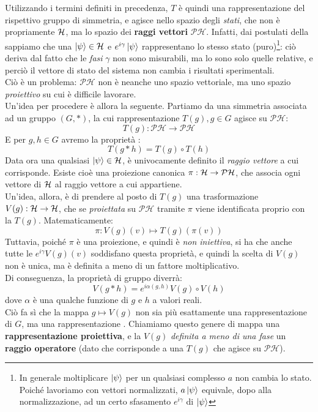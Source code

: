 \documentclass[../../FisicaTeorica.tex]{subfiles}
\begin{document}
Utilizzando i termini definiti in precedenza, $T$ è quindi una rappresentazione del rispettivo gruppo di simmetria, e agisce nello spazio degli \textit{stati}, che non è propriamente $\mathcal{H}$, ma lo spazio dei \textbf{raggi vettori} $\mathcal{PH}$. Infatti, dai postulati della \MQ sappiamo che una $\Ket{\psi} \in \mathcal{H}$ e $e^{i\gamma} \Ket{\psi}$ rappresentano lo stesso stato (puro)\footnote{In generale moltiplicare $\Ket{\psi}$ per un qualsiasi complesso $a$ non cambia lo stato. Poiché lavoriamo con vettori normalizzati, $a\Ket{\psi}$ equivale, dopo alla normalizzazione, ad un certo sfasamento $e^{i\gamma}$ di $\Ket{\psi}$}: ciò deriva dal fatto che le \textit{fasi }  $\gamma$ non sono misurabili, ma lo sono solo quelle relative, e perciò  il vettore di stato del sistema non cambia i risultati sperimentali.\\
Ciò è un problema: $\mathcal{PH}$ non è neanche uno spazio vettoriale, ma uno spazio \textit{proiettivo} su cui è difficile lavorare.\\
Un'idea per procedere è allora la seguente. Partiamo da una simmetria associata ad un gruppo $(G,*)$, la cui rappresentazione $T(g), g\in G$ agisce su $\mathcal{PH}$:
\[
T(g):\mathcal{PH}\to \mathcal{PH}
\]
E per $g, h \in G$ avremo la proprietà :
\[
T(g*h) = T(g) \circ T(h)
\]
Data ora una qualsiasi $\Ket{\psi}\in \mathcal{H}$, è univocamente definito il \textit{raggio vettore} a cui corrisponde. Esiste cioè una proiezione canonica $\pi:\mathcal{H} \to \mathcal{PH}$, che associa ogni vettore di $\mathcal{H}$ al raggio vettore a cui appartiene.\\
Un'idea, allora, è di prendere al posto di $T(g)$ una trasformazione $V(g):\mathcal{H}\to \mathcal{H}$, che se \textit{proiettata} su $\mathcal{PH}$ tramite $\pi$ viene identificata proprio con la $T(g)$. Matematicamente:
\[
\pi: 
V(g)(v)\mapsto T(g)(\pi(v))
\]
Tuttavia, poiché $\pi$ è una proiezione, e quindi è \textit{non iniettiva}, si ha che anche tutte le $e^{i\gamma}V(g)(v)$ soddisfano questa proprietà, e quindi la scelta di $V(g)$ non è unica, ma è definita a meno di un fattore moltiplicativo.\\
Di conseguenza, la proprietà di gruppo diverrà:
\[
V(g*h) = e^{i\alpha(g,h)} V(g) \circ V(h)
\]
dove $\alpha$ è una qualche funzione di $g$ e $h$ a valori reali.\\
Ciò fa sì che la mappa $g \mapsto V(g)$ non sia più esattamente una rappresentazione di $G$, ma una rappresentazione . Chiamiamo questo genere di mappa una \textbf{rappresentazione proiettiva}, e la $V(g)$ \textit{definita a meno di una fase} un \textbf{raggio operatore} (dato che corrisponde a una $T(g)$ che agisce su $\mathcal{PH}$).\\
\end{document}
